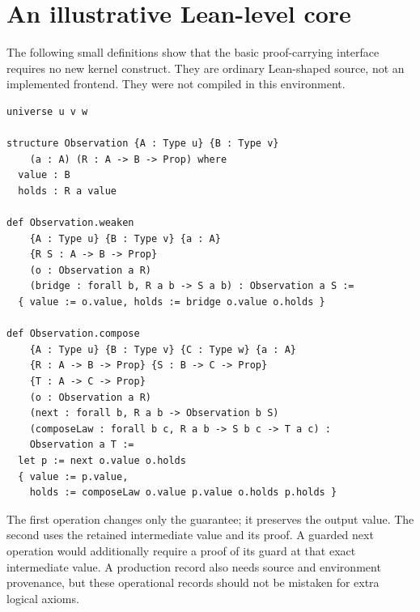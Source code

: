 \documentclass[11pt,a4paper]{article}
\theoremstyle{plain}\newtheorem{proposition}{Proposition}[section]
\theoremstyle{definition}\newtheorem{definition}[proposition]{Definition}
\theoremstyle{remark}\newtheorem{remark}[proposition]{Remark}
\begin{document}
\appendix
\section{An illustrative Lean-level core}\label{app:core}
The following small definitions show that the basic proof-carrying interface requires no new kernel construct. They are ordinary Lean-shaped source, not an implemented frontend. They were not compiled in this environment.
\begin{lstlisting}
universe u v w

structure Observation {A : Type u} {B : Type v}
    (a : A) (R : A -> B -> Prop) where
  value : B
  holds : R a value

def Observation.weaken
    {A : Type u} {B : Type v} {a : A}
    {R S : A -> B -> Prop}
    (o : Observation a R)
    (bridge : forall b, R a b -> S a b) : Observation a S :=
  { value := o.value, holds := bridge o.value o.holds }

def Observation.compose
    {A : Type u} {B : Type v} {C : Type w} {a : A}
    {R : A -> B -> Prop} {S : B -> C -> Prop}
    {T : A -> C -> Prop}
    (o : Observation a R)
    (next : forall b, R a b -> Observation b S)
    (composeLaw : forall b c, R a b -> S b c -> T a c) :
    Observation a T :=
  let p := next o.value o.holds
  { value := p.value,
    holds := composeLaw o.value p.value o.holds p.holds }
\end{lstlisting}
The first operation changes only the guarantee; it preserves the output value. The second uses the retained intermediate value and its proof. A guarded next operation would additionally require a proof of its guard at that exact intermediate value. A production record also needs source and environment provenance, but these operational records should not be mistaken for extra logical axioms.
\end{document}
